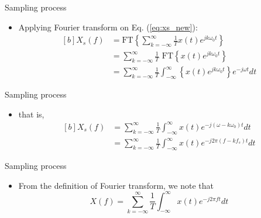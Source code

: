 \documentclass[pdflatex,compress,mathserif]{beamer}
\begin{document}
\begin{frame}{Sampling process}
    \begin{itemize}
        \item Applying Fourier transform on Eq. (\ref{eq:xs_new}):
        \begin{equation}
            \begin{aligned}[b]
                X_s(f) &= \text{FT} \left\{ \sum_{k = -\infty}^{\infty} \frac{1}{T} x(t) e^{jk\omega_0t} \right\} \\
                &= \sum_{k = -\infty}^{\infty} \frac{1}{T} \text{ FT} \left\{ x(t) e^{jk\omega_0t} \right\} \\
                &= \sum_{k = -\infty}^{\infty} \frac{1}{T} \int_{-\infty}^{\infty} \left\{ x(t) e^{jk\omega_0t} \right\}e^{-j\omega t} dt
            \end{aligned}
        \end{equation}
    \end{itemize}
\end{frame}

\begin{frame}{Sampling process}
    \begin{itemize}
        \item that is,
        \begin{equation}
            \begin{aligned}[b]
                X_s(f) &= \sum_{k = -\infty}^{\infty} \frac{1}{T} \int_{-\infty}^{\infty} x(t) e^{-j(\omega-k\omega_0) t} dt \\
                 &= \sum_{k = -\infty}^{\infty} \frac{1}{T} \int_{-\infty}^{\infty} x(t) e^{-j2\pi(f-kf_s) t} dt
                \label{eq:Xsf}
            \end{aligned}
        \end{equation}
    \end{itemize}
\end{frame}

\begin{frame}{Sampling process}
    \begin{itemize}
        \item From the definition of Fourier transform, we note that
        \begin{equation}
            X(f) = \sum_{k = -\infty}^{\infty} \frac{1}{T} \int_{-\infty}^{\infty} x(t) e^{-j2\pi ft} dt
            \label{eq:Xf}
        \end{equation}
    \end{itemize}
\end{frame}
\end{document}
